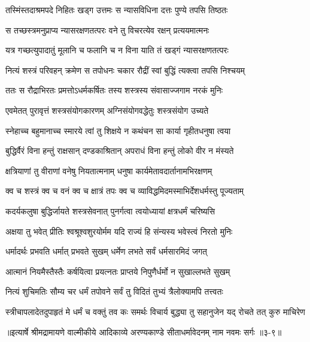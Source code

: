 \twolineshloka
{तस्मिंस्तदाश्रमपदे निहितः खड्ग उत्तमः}
{स न्यासविधिना दत्तः पुण्ये तपसि तिष्ठतः} %

\twolineshloka
{स तच्छस्त्रमनुप्राप्य न्यासरक्षणतत्परः}
{वने तु विचरत्येव रक्षन् प्रत्ययमात्मनः} %

\twolineshloka
{यत्र गच्छत्युपादातुं मूलानि च फलानि च}
{न विना याति तं खड्गं न्यासरक्षणतत्परः} %

\twolineshloka
{नित्यं शस्त्रं परिवहन् क्रमेण स तपोधनः}
{चकार रौद्रीं स्वां बुद्धिं त्यक्त्वा तपसि निश्चयम्} %

\twolineshloka
{ततः स रौद्राभिरतः प्रमत्तोऽधर्मकर्षितः}
{तस्य शस्त्रस्य संवासाज्जगाम नरकं मुनिः} %

\twolineshloka
{एवमेतत् पुरावृत्तं शस्त्रसंयोगकारणम्}
{अग्निसंयोगवद्धेतुः शस्त्रसंयोग उच्यते} %

\twolineshloka
{स्नेहाच्च बहुमानाच्च स्मारये त्वां तु शिक्षये}
{न कथंचन सा कार्या गृहीतधनुषा त्वया} %

\twolineshloka
{बुद्धिर्वैरं विना हन्तुं राक्षसान् दण्डकाश्रितान्}
{अपराधं विना हन्तुं लोको वीर न मंस्यते} %

\twolineshloka
{क्षत्रियाणां तु वीराणां वनेषु नियतात्मनाम्}
{धनुषा कार्यमेतावदार्तानामभिरक्षणम्} %

\twolineshloka
{क्व च शस्त्रं क्व च वनं क्व च क्षात्रं तपः क्व च}
{व्याविद्धमिदमस्माभिर्देशधर्मस्तु पूज्यताम्} %

\twolineshloka
{कदर्यकलुषा बुद्धिर्जायते शस्त्रसेवनात्}
{पुनर्गत्वा त्वयोध्यायां क्षत्रधर्मं चरिष्यसि} %

\twolineshloka
{अक्षया तु भवेत् प्रीतिः श्वश्रूश्वशुरयोर्मम}
{यदि राज्यं हि संन्यस्य भवेस्त्वं निरतो मुनिः} %

\twolineshloka
{धर्मादर्थः प्रभवति धर्मात् प्रभवते सुखम्}
{धर्मेण लभते सर्वं धर्मसारमिदं जगत्} %

\twolineshloka
{आत्मानं नियमैस्तैस्तैः कर्षयित्वा प्रयत्नतः}
{प्राप्तये निपुणैर्धर्मो न सुखाल्लभते सुखम्} %

\twolineshloka
{नित्यं शुचिमतिः सौम्य चर धर्मं तपोवने}
{सर्वं तु विदितं तुभ्यं त्रैलोक्यामपि तत्त्वतः} %

\twolineshloka
{स्त्रीचापलादेतदुपाहृतं मे धर्मं च वक्तुं तव कः समर्थः}
{विचार्य बुद्ध्या तु सहानुजेन यद् रोचते तत् कुरु माचिरेण} %


॥इत्यार्षे श्रीमद्रामायणे वाल्मीकीये आदिकाव्ये अरण्यकाण्डे सीताधर्मावेदनम् नाम नवमः सर्गः ॥३-९॥
